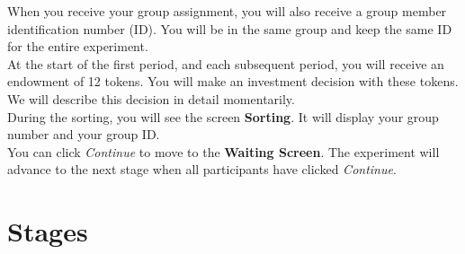 \documentclass[12pt]{article}
\begin{document}
\begin{figure}[H]
{    
  \label{fig:subfigure12}}
%
\end{figure}


When you receive your group assignment, you will also receive a group member identification number (ID).  You will be in the same group and keep the same ID for the entire experiment.\\

At the start of the first period, and each subsequent period, you will receive an endowment of 12 tokens.  You will make an investment decision with these tokens. We will describe this decision in detail momentarily.\\

During the sorting, you will see the screen {\bf Sorting}. It will display your group number and your group ID.\\

You can click {\em Continue} to move to the {\bf Waiting Screen}.  The experiment will advance to the next stage when all participants have clicked {\em Continue}.



\section*{Stages}
 
\end{document}

